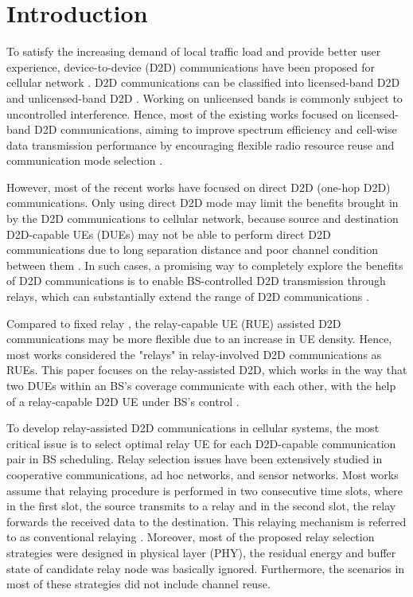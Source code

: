 \documentclass[conference]{IEEEtran}
\begin{document}
\IEEEpeerreviewmaketitle
\section{Introduction}
To satisfy the increasing demand of local traffic load and provide better user experience, device-to-device (D2D) communications have been proposed for cellular network \cite{5350367,7949342,7254241}. D2D communications can be classified into licensed-band D2D and unlicensed-band D2D \cite{7128330}. Working on unlicensed bands is commonly subject to uncontrolled interference. Hence, most of the existing works focused on licensed-band D2D communications, aiming to improve spectrum efficiency and cell-wise data transmission performance by encouraging flexible radio resource reuse and communication mode selection \cite{7878672,7504380,7742334}.

However, most of the recent works have focused on direct D2D (one-hop D2D) communications. Only using direct D2D mode may limit the benefits brought in by the D2D communications to cellular network, because source and destination D2D-capable UEs (DUEs) may not be able to perform direct D2D communications due to long separation distance and poor channel condition between them \cite{7876267}. In such cases, a promising way to completely explore the benefits of D2D communications is to enable BS-controlled D2D transmission through relays, which can substantially extend the range of D2D communications \cite{7925800}.

Compared to fixed relay \cite{6775376}, the relay-capable UE (RUE) assisted D2D communications may be more flexible due to an increase in UE density. Hence, most works considered the "relays" in relay-involved D2D communications as RUEs. This paper focuses on the relay-assisted D2D, which works in the way that two DUEs within an BS's coverage communicate with each other, with the help of a relay-capable D2D UE under BS's control \cite{7450161,7752964}.

To develop relay-assisted D2D communications in cellular systems, the most critical issue is to select optimal relay UE for each D2D-capable communication pair in BS scheduling. Relay selection issues have been extensively studied in cooperative communications, ad hoc networks, and sensor networks. Most works assume that relaying procedure is performed in two consecutive time slots, where in the first slot, the source transmits to a relay and in the second slot, the relay forwards the received data to the destination. This relaying mechanism is referred to as conventional relaying \cite{6807959}. Moreover, most of the proposed relay selection strategies were designed in physical layer (PHY), the residual energy and buffer state of candidate relay node was basically ignored. Furthermore, the scenarios in most of these strategies did not include channel reuse.
\end{document}
